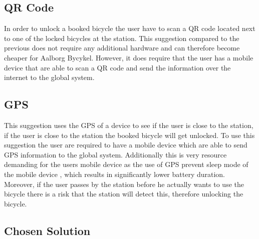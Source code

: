 \subsection{QR Code}
In order to unlock a booked bicycle the user have to scan a QR code located next to one of the locked bicycles at the station.
This suggestion compared to the previous does not require any additional hardware and can therefore become cheaper for Aalborg Bycykel.
However, it does require that the user has a mobile device that are able to scan a QR code and send the information over the internet to the global system.

\subsection{GPS}
This suggestion uses the GPS of a device to see if the user is close to the station, if the user is close to the station the booked bicycle will get unlocked.
To use this suggestion the user are required to have a mobile device which are able to send GPS information to the global system.
Additionally this is very resource demanding for the users mobile device as the use of GPS prevent sleep mode of the mobile device \citep{misc:gpsbatteryusage}, which results in significantly lower battery duration.
Moreover, if the user passes by the station before he actually wants to use the bicycle there is a risk that the station will detect this, therefore unlocking the bicycle.

\subsection{Chosen Solution}